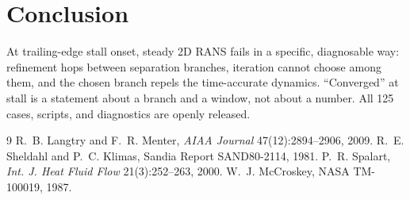 \documentclass[10pt,a4paper]{article}
\begin{document}
\section{Conclusion}
At trailing-edge stall onset, steady 2D RANS fails in a specific, diagnosable way: refinement hops between separation branches, iteration cannot choose among them, and the chosen branch repels the time-accurate dynamics. ``Converged'' at stall is a statement about a branch and a window, not about a number. All 125 cases, scripts, and diagnostics are openly released.

\begin{thebibliography}{9}\footnotesize
{} R.~B. Langtry and F.~R. Menter, \emph{AIAA Journal} 47(12):2894--2906, 2009.
 R.~E. Sheldahl and P.~C. Klimas, Sandia Report SAND80-2114, 1981.
 P.~R. Spalart, \emph{Int. J. Heat Fluid Flow} 21(3):252--263, 2000.
 W.~J. McCroskey, NASA TM-100019, 1987.
\end{thebibliography}
\end{document}
